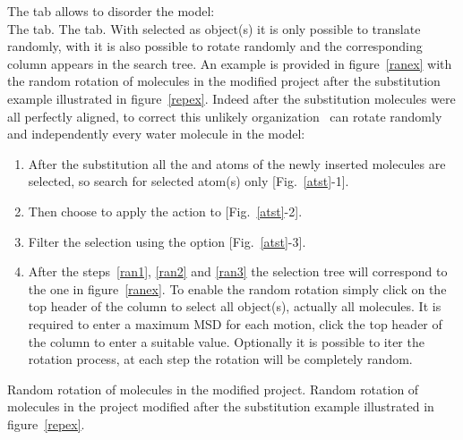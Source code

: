 The  tab allows to disorder the model: \\
{The  tab.}
{The  tab. With  selected as object(s) it is only possible to translate randomly, with  it is also possible to rotate randomly and the corresponding column appears in the search tree.}
\laf An example is provided in figure~\ref{ranex} with the random rotation of  molecules in the modified \aob{\sio} project after the substitution example illustrated in figure~\ref{repex}. Indeed after the substitution  molecules were all perfectly aligned, to correct this unlikely organization \atomes\ can rotate randomly and independently every water molecule in the model:
\begin{enumerate}
\item\label{ran1} After the substitution all the  and  atoms of the newly inserted  molecules are selected, so search for selected atom(s) only [Fig.~\ref{atst}-1]. 
\item\label{ran2} Then choose to apply the action to  [Fig.~\ref{atst}-2].
\item\label{ran3} Filter the selection using the  option [Fig.~\ref{atst}-3].
\item After the steps~\ref{ran1}, \ref{ran2} and \ref{ran3} the selection tree will correspond to the one in figure~\ref{ranex}. To enable the random rotation simply click on the top header of the  column to select all object(s), actually all  molecules. It is required to enter a maximum MSD for each motion, click the top header of the  column to enter a suitable value. Optionally it is possible to iter the rotation process, at each step the rotation will be completely random. 
\end{enumerate}
{Random rotation of  molecules in the modified \aob{\sio} project.}
{Random rotation of  molecules in the \aob{\sio} project modified after the substitution example illustrated in figure~\ref{repex}.}
\newpage
{}
